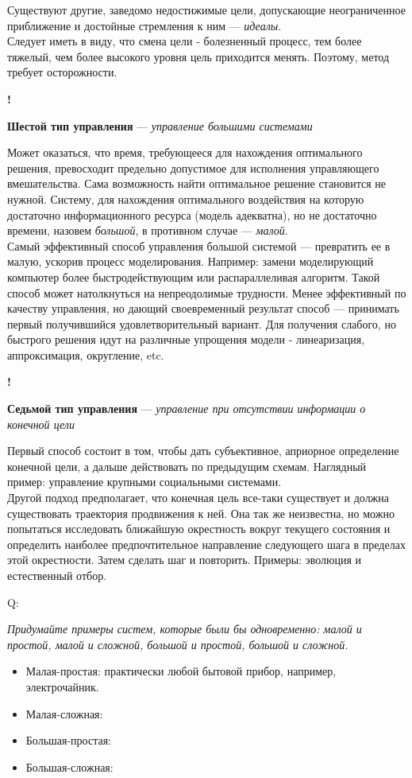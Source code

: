 \documentclass{article}
\newcommand{\note}[1]{\textit{#1}}
\newcommand{\define}[2]{
	\textbf{#1} --- #2
	}
\newcommand{\marked}[2]{
	\begin{flushright}\textbf{!}\hspace{2ex}\vline\hspace{2ex}
		\begin{minipage}{0.9\textwidth}
			\define{#1}{#2}
		\end{minipage}
	\end{flushright}
	}
\newcommand{\question}[2]{
	\begin{flushright}
		Q:\hspace{2ex}\vline\hspace{2ex}
		\begin{minipage}{0.9\textwidth}
			\large
			\textit{#1}
		\end{minipage}
	\end{flushright}
	\begin{center}
		\begin{minipage}{0.95\textwidth}
			#2
		\end{minipage}
	\end{center}
	}
\begin{document}
Существуют другие, заведомо недостижимые цели, допускающие неограниченное приближение и достойные стремления к ним --- \note{идеалы}.\\
Следует иметь в виду, что смена цели - болезненный процесс, тем более тяжелый, чем более высокого уровня цель приходится менять. Поэтому, метод требует осторожности.
\marked{Шестой тип управления}{\note{управление большими системами}}
Может оказаться, что время, требующееся для нахождения оптимального решения, превосходит предельно допустимое для исполнения управляющего вмешательства. Сама возможность найти оптимальное решение становится не нужной. Систему, для нахождения оптимального воздействия на которую достаточно информационного ресурса (модель адекватна), но не достаточно времени, назовем \note{большой}, в противном случае --- \note{малой}.\\
Самый эффективный способ управления большой системой --- превратить ее в малую, ускорив процесс моделирования. Например: замени моделирующий компьютер более быстродействующим или распараллеливая алгоритм. Такой способ может натолкнуться на непреодолимые трудности. Менее эффективный по качеству управления, но дающий своевременный результат способ  --- принимать первый получившийся удовлетворительный вариант. Для получения слабого, но быстрого решения идут на различные упрощения модели - линеаризация, аппроксимация, округление, etc.
\marked{Седьмой тип управления}{\note{управление при отсутствии информации о конечной цели}}
Первый способ состоит в том, чтобы дать субъективное, априорное определение конечной цели, а дальше действовать по предыдущим схемам. Наглядный пример: управление крупными социальными системами.\\
Другой подход предполагает, что конечная цель все-таки существует и должна существовать траектория продвижения к ней. Она так же неизвестна, но можно попытаться исследовать ближайшую окрестность вокруг текущего состояния и определить наиболее предпочтительное направление следующего шага в пределах этой окрестности. Затем сделать шаг и повторить. Примеры: эволюция и естественный отбор.

\question{Придумайте примеры систем, которые были бы одновременно: малой и простой, малой и сложной, большой и простой, большой и сложной.}{
\begin{itemize}
	\item Малая-простая: практически любой бытовой прибор, например, электрочайник.
	\item Малая-сложная:
	\item Большая-простая:
	\item Большая-сложная:
\end{itemize}}
\end{document}
